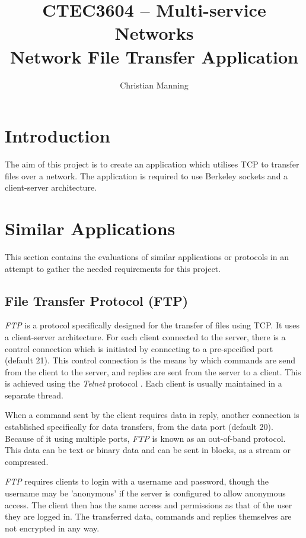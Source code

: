\documentclass[a4paper]{article}
\title{CTEC3604 -- Multi-service Networks\\
Network File Transfer Application}
\author{Christian Manning}
\begin{document}
\maketitle

\tableofcontents

\pagebreak

\section{Introduction}

The aim of this project is to create an application which utilises TCP to transfer files over a network. The application is required to use Berkeley sockets and a client-server architecture.

\section{Similar Applications}

This section contains the evaluations of similar applications or protocols in an attempt to gather the needed requirements for this project.

\subsection{File Transfer Protocol (FTP)}

\textit{FTP} \cite{rfc959} is a protocol specifically designed for the transfer of files using TCP. It uses a client-server architecture. For each client connected to the server, there is a control connection which is initiated by connecting to a pre-specified port (default 21). This control connection is the means by which commands are send from the client to the server, and replies are sent from the server to a client. This is achieved using the \textit{Telnet} protocol \cite{rfc854}. Each client is usually maintained in a separate thread.

When a command sent by the client requires data in reply, another connection is established specifically for data transfers, from the data port (default 20). Because of it using multiple ports, \textit{FTP} is known as an out-of-band protocol. This data can be text or binary data and can be sent in blocks, as a stream or compressed.

\textit{FTP} requires clients to login with a username and password, though the username may be 'anonymous' if the server is configured to allow anonymous access. The client then has the same access and permissions as that of the user they are logged in. The transferred data, commands and replies themselves are not encrypted in any way.
\end{document}
